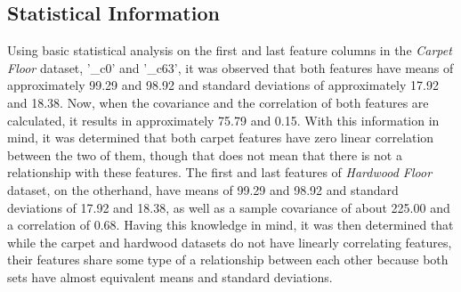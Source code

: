 \documentclass[a4paper,12pt]{IEEEtran}
\begin{document}
\subsection{Statistical Information}
\label{sec1}
Using basic statistical analysis on the first and last feature columns in the \textit{Carpet Floor} dataset, '\_c0' and '\_c63', it was observed that both features have means of approximately 99.29 and 98.92 and standard deviations of approximately 17.92 and 18.38. Now, when the covariance and the correlation of both features are calculated, it results in approximately 75.79 and 0.15. With this information in mind, it was determined that both carpet features have zero linear correlation between the two of them, though that does not mean that there is not a relationship with these features. The first and last features of \textit{Hardwood Floor} dataset, on the otherhand, have means of 99.29 and 98.92 and standard deviations of 17.92 and 18.38, as well as a sample covariance of about 225.00 and a correlation of 0.68. Having this knowledge in mind, it was then determined that while the carpet and hardwood datasets do not have linearly correlating features, their features share some type of a relationship between each other because both sets have almost equivalent means and standard deviations.
\end{document}
